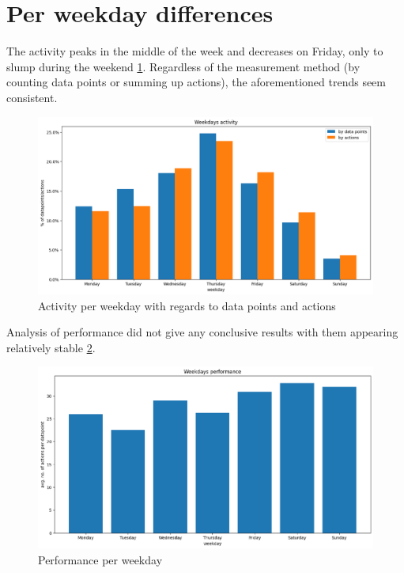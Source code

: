 \section{Per weekday differences}

The activity peaks in the middle of the week and decreases on Friday, only to slump during the weekend \ref{fig:weekday_activity}. Regardless of the measurement method (by counting data points or summing up actions), the aforementioned trends seem consistent.

\begin{figure}[htbp]
  \centering
  \includegraphics[scale=0.5]{chapters/results/graphics/activity-by-weekday.png}
  \caption{Activity per weekday with regards to data points and actions}
  \label{fig:weekday_activity}
\end{figure}

Analysis of performance did not give any conclusive results with them appearing relatively stable \ref{fig:weekday_performance}.

\begin{figure}[htbp]
  \centering
  \includegraphics[scale=0.5]{chapters/results/graphics/weekdays-performance.png}
  \caption{Performance per weekday}
  \label{fig:weekday_performance}
\end{figure}
